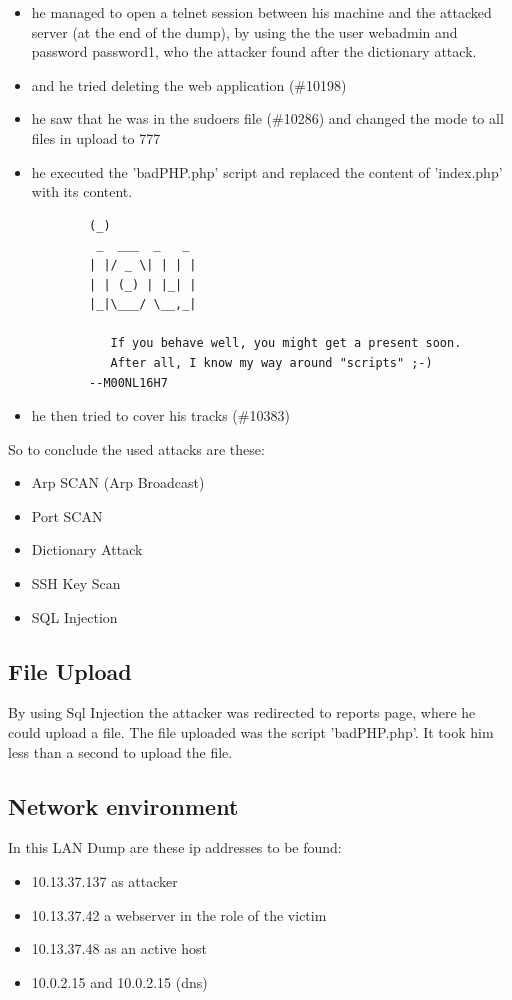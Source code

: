 \begin{itemize}
    \item he managed to open a telnet session between his machine and the attacked server (at the end of the dump), by using the the user webadmin and password password1, who the attacker found after the dictionary attack.
    \item and he tried deleting the web application (\#10198)
    \item he saw that he was in the sudoers file (\#10286) and changed the mode to all files in upload to 777
    \item he executed the 'badPHP.php' script and replaced the content of 'index.php' with its content.
    \begin{verbatim}
        (_)
         _  ___  _   _
        | |/ _ \| | | |
        | | (_) | |_| |
        |_|\___/ \__,_|

           If you behave well, you might get a present soon.
           After all, I know my way around "scripts" ;-)
        --M00NL16H7
    \end{verbatim}
    \item he then tried to cover his tracks (\#10383)
\end{itemize}

So to conclude the used attacks are these: 
\begin{itemize}
    \item Arp SCAN (Arp Broadcast)
    \item Port SCAN
    \item Dictionary Attack
    \item SSH Key Scan
    \item SQL Injection
\end{itemize}

\subsection{File Upload}
By using Sql Injection the attacker was redirected to reports page, where he could upload a file.
The file uploaded was the script 'badPHP.php'.
It took him less than a second to upload the file.

\subsection{Network environment}
In this LAN Dump are these ip addresses to be found: 
\begin{itemize}
    \item 10.13.37.137 as attacker
    \item 10.13.37.42 a webserver in the role of the victim 
    \item 10.13.37.48 as an active host
    \item 10.0.2.15 and 10.0.2.15 (dns)
\end{itemize}

